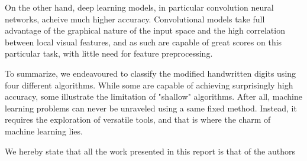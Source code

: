 \documentclass{acm_proc_article-sp}
\begin{document}
On the other hand, deep learning models, in particular convolution neural networks, acheive much higher accuracy. Convolutional models take full advantage of the graphical nature of the input space and the high correlation between local visual features, and as such are capable of great scores on this particular task, with little need for feature preprocessing.

To summarize, we endeavoured to classify the modified handwritten digits using four different algorithms. While some are capable of  achieving surprisingly high accuracy,  some illustrate the limitation of "shallow" algorithms. After all, machine learning problems can never be unraveled using a same fixed method. Instead, it requires the exploration of versatile tools, and that is where the charm of machine learning lies.


We	hereby	state	that	all	the	work	 presented	in	this	report	is	that	of	the	authors

  
\end{document}
